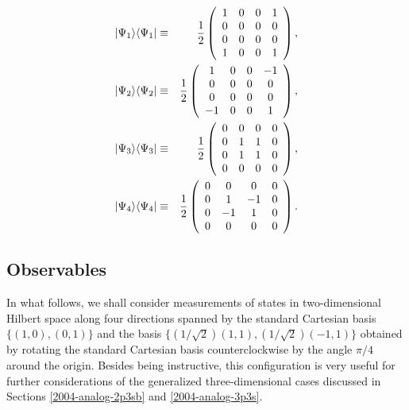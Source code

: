 \documentclass[pra,preprint,showpacs,showkeys,amsfonts]{revtex4}
\begin{document}
\begin{eqnarray}
\vert \Psi_1 \rangle \langle \Psi_1 \vert &\equiv &{1\over {2}}
\left(
\begin{array}{cccc}
1&0&0&1\\
0&0&0&0\\
0&0&0&0\\
1&0&0&1
\end{array}
\right)
, \label{2004-analog-e2a}\\
\vert \Psi_2 \rangle \langle \Psi_2 \vert &\equiv &{1\over {2}}
\left(
\begin{array}{cccc}
1&0&0&-1\\
0&0&0&0\\
0&0&0&0\\
-1&0&0&1
\end{array}
\right)
, \label{2004-analog-e2b}\\
\vert \Psi_3 \rangle \langle \Psi_3 \vert &\equiv &{1\over {2}}
\left(
\begin{array}{cccc}
0&0&0&0\\
0&1&1&0\\
0&1&1&0\\
0&0&0&0
\end{array}
\right)
, \label{2004-analog-e2c}\\
\vert \Psi_4 \rangle \langle \Psi_4 \vert &\equiv &{1\over {2}}
\left(
\begin{array}{cccc}
0&0&0&0\\
0&1&-1&0\\
0&-1&1&0\\
0&0&0&0
\end{array}
\right)
. \label{2004-analog-e2d}
\end{eqnarray}



\subsection{Observables}

In what follows, we shall consider measurements of states in two-dimensional Hilbert space
along four directions spanned by the standard Cartesian basis $\{(1,0),(0,1)\}$
and the basis
$\{(1/\sqrt{2})(1,1),(1/\sqrt{2})(-1,1)\}$
obtained by rotating the standard Cartesian basis counterclockwise by the angle $\pi /4$ around the origin.
Besides being instructive, this configuration is very useful for further considerations
of the generalized three-dimensional cases discussed in Sections
\ref{2004-analog-2p3sb}
and
\ref{2004-analog-3p3s}.
\end{document}
